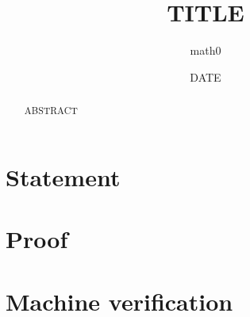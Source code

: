 \documentclass[11pt]{amsart}
\title{TITLE}
\author{math0}
\date{DATE}
\theoremstyle{plain}
\theoremstyle{definition}
\begin{document}
\begin{abstract}
ABSTRACT
\end{abstract}
\maketitle

\section{Statement}
\section{Proof}
\section{Machine verification}
\end{document}
